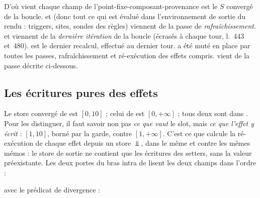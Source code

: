 \begin{invariant}{D'où vient chaque champ de l'}{point-fixe-composant-provenance}
 est le $S$ convergé de la boucle.  et
 (donc tout ce qui est évalué \og dans l'environnement de
sortie du rendu\fg{} : triggers, sites, sondes des règles) viennent de la
passe de \emph{rafraîchissement}.  et
 viennent de la \emph{dernière itération} de la
boucle (écrasés à chaque tour, l.~443 et~480).  est le
dernier recalcul, effectué au dernier tour.  a été muté en place
par toutes les passes, rafraîchissement et ré-exécution des effets compris.
 vient de la passe décrite ci-dessous.
\end{invariant}

\subsection{Les écritures pures des effets}
\label{sec:point-fixe-composant-pure}


Le store convergé de  est $[0,10]$ ; celui de 
est $[0,+\infty]$ ; tous deux sont dans . Pour les
distinguer, il faut savoir non pas \emph{ce que vaut} le slot, mais
\emph{ce que l'effet y écrit} : $[1,10]$, borné par la garde, contre
$[1,+\infty]$. C'est ce que calcule la ré-exécution de chaque effet depuis
un store $\Bot$, dans le même  et contre les mêmes mémos : le
store de sortie ne contient que les écritures des setters, sans la valeur
préexistante. Les deux portes du bras intra de  lisent
les deux champs dans l'ordre :


avec le prédicat de divergence :


